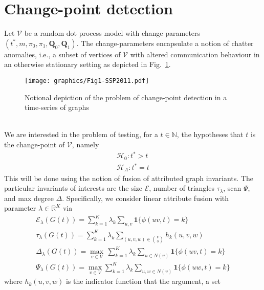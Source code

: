 \documentclass[draftcls]{IEEEtran}
\theoremstyle{definition}
\begin{document}
\section{Change-point detection}
Let $\mathscr{V}$ be a random dot process model with change parameters
$(t^{*}, m, \pi_0, \pi_1, \mathbf{Q}_0, \mathbf{Q}_1)$. The
change-parameters encapsulate a notion of chatter anomalies, i.e., a
subset of vertices of $\mathscr{V}$ with altered communication
behaviour in an otherwise stationary setting as depicted in Fig.~\ref{fig:notional_change_point}. 
\begin{figure}[htbp]
  \centering
  \texttt{[image: graphics/Fig1-SSP2011.pdf]}
  \caption{Notional depiction of the problem of change-point detection in a time-series of graphs}
  \label{fig:notional_change_point}
\end{figure}
\\ \noindent
We are interested in
the problem of testing, for a $t \in \mathbb{N}$, the hypotheses that
$t$ is the change-point of $\mathscr{V}$, namely
\begin{gather*}
  \mathscr{H}_0 \colon t^{*} > t \\
  \mathscr{H}_A \colon t^{*} = t
\end{gather*}
This will be done using the notion of fusion of attributed graph
invariants. The particular invariants of interests are the size
$\mathcal{E}$, number of triangles $\tau_{\lambda}$, scan $\Psi$, and
max degree $\Delta$. Specifically, we consider linear attribute
fusion with parameter $\lambda \in \mathbb{R}^{K}$ via
\begin{gather}
  \label{eq:6}
  \mathcal{E}_{\lambda}(G(t)) = \sum_{k=1}^{K} \lambda_k \sum_{u,v}
  \mathbf{1}\{ \phi(uv,t) = k \} \\
  \tau_\lambda(G(t)) = \sum_{k=1}^{K} \lambda_k \!\! \sum_{(u,v,w) \in
    \binom{V}{3}} h_k(u,v,w) \\
  \Delta_{\lambda}(G(t)) = \max_{v \in V} \, \sum_{k = 1}^{K} \lambda_k
  \sum_{u \in N(v)}{\mathbf{1}\{\phi(uv,t) = k\}} \\
  \label{eq:3}
  \Psi_{\lambda}(G(t)) = \max_{v \in V} \sum_{k = 1}^{K}
  \lambda_k \!\!\sum_{u,w \in N(v)}\!\!\! \mathbf{1}\{\phi(uw,t) = k\} 
  \end{gather}
where $h_k(u,v,w)$ is the indicator function that the argument, a set
\end{document}
